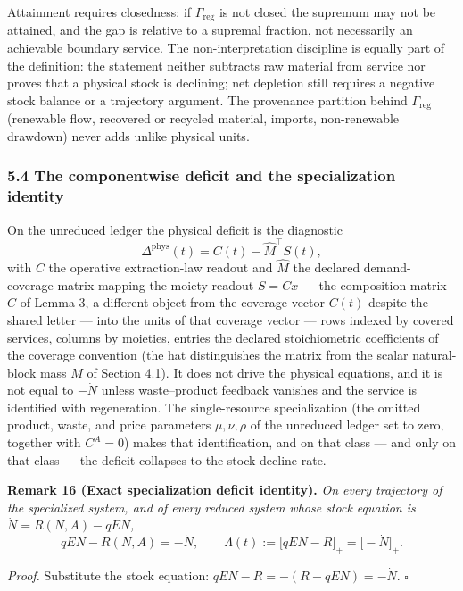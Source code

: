 \documentclass[11pt]{article}
\begin{document}
Attainment requires closedness: if \(\Gamma_{\mathrm{reg}}\) is not
closed the supremum may not be attained, and the gap is relative to a
supremal fraction, not necessarily an achievable boundary service. The
non-interpretation discipline is equally part of the definition: the
statement neither subtracts raw material from service nor proves that a
physical stock is declining; net depletion still requires a negative
stock balance or a trajectory argument. The provenance partition behind
\(\Gamma_{\mathrm{reg}}\) (renewable flow, recovered or recycled
material, imports, non-renewable drawdown) never adds unlike physical
units.

\subsubsection{5.4 The componentwise deficit and the specialization
identity}\label{the-componentwise-deficit-and-the-specialization-identity}

On the unreduced ledger the physical deficit is the diagnostic
\[\Delta^{\mathrm{phys}}(t) = C(t) - \widehat{M}^\top S(t),\] with \(C\)
the operative extraction-law readout and \(\widehat{M}\) the declared
demand-coverage matrix mapping the moiety readout \(S = Cx\) --- the
composition matrix \(C\) of Lemma 3, a different object from the
coverage vector \(C(t)\) despite the shared letter --- into the units of
that coverage vector --- rows indexed by covered services, columns by
moieties, entries the declared stoichiometric coefficients of the
coverage convention (the hat distinguishes the matrix from the scalar
natural-block mass \(M\) of Section 4.1). It does not drive the physical
equations, and it is not equal to \(-\dot N\) unless waste--product
feedback vanishes and the service is identified with regeneration. The
single-resource specialization (the omitted product, waste, and price
parameters \(\mu, \nu, \rho\) of the unreduced ledger set to zero,
together with \(C^A = 0\)) makes that identification, and on that class
--- and only on that class --- the deficit collapses to the
stock-decline rate.

\textbf{Remark 16 (Exact specialization deficit identity).} \emph{On
every trajectory of the specialized system, and of every reduced system
whose stock equation is \(\dot N = R(N,A) - qEN\),}
\[qEN - R(N,A) = -\dot N, \qquad \Lambda(t) := \bigl[ qEN - R \bigr]_+ = \bigl[ -\dot N \bigr]_+.\]

\emph{Proof.} Substitute the stock equation:
\(qEN - R = -(R - qEN) = -\dot N\). \ensuremath{\square}
\end{document}
